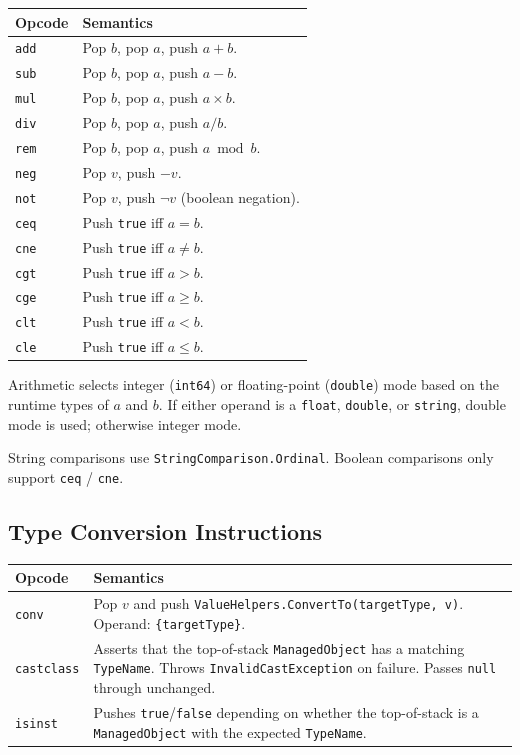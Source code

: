 \documentclass[11pt,a4paper]{article}
\newcommand{\code}[1]{\texttt{\small #1}}
\newcommand{\typename}[1]{\textcolor{typecolor}{\texttt{\small #1}}}
\begin{document}
\begin{longtable}{lp{10cm}}
  \toprule
  \textbf{Opcode} & \textbf{Semantics} \\
  \midrule
  \endhead
  \code{add}  & Pop \(b\), pop \(a\), push \(a + b\). \\
  \code{sub}  & Pop \(b\), pop \(a\), push \(a - b\). \\
  \code{mul}  & Pop \(b\), pop \(a\), push \(a \times b\). \\
  \code{div}  & Pop \(b\), pop \(a\), push \(a / b\). \\
  \code{rem}  & Pop \(b\), pop \(a\), push \(a \bmod b\). \\
  \code{neg}  & Pop \(v\), push \(-v\). \\
  \code{not}  & Pop \(v\), push \(\neg v\) (boolean negation). \\
  \code{ceq}  & Push \code{true} iff \(a = b\). \\
  \code{cne}  & Push \code{true} iff \(a \neq b\). \\
  \code{cgt}  & Push \code{true} iff \(a > b\). \\
  \code{cge}  & Push \code{true} iff \(a \geq b\). \\
  \code{clt}  & Push \code{true} iff \(a < b\). \\
  \code{cle}  & Push \code{true} iff \(a \leq b\). \\
  \bottomrule
\end{longtable}

Arithmetic selects integer (\code{int64}) or floating-point (\code{double}) mode
based on the runtime types of \(a\) and \(b\). If either operand is a \code{float},
\code{double}, or \code{string}, double mode is used; otherwise integer mode.

String comparisons use \code{StringComparison.Ordinal}. Boolean comparisons only
support \code{ceq} / \code{cne}.

\subsection{Type Conversion Instructions}

\begin{longtable}{lp{10cm}}
  \toprule
  \textbf{Opcode} & \textbf{Semantics} \\
  \midrule
  \endhead
  \code{conv}       & Pop \(v\) and push \code{ValueHelpers.ConvertTo(targetType, v)}.
                      Operand: \code{\{targetType\}}. \\
  \code{castclass}  & Asserts that the top-of-stack \typename{ManagedObject} has a
                      matching \code{TypeName}. Throws \typename{InvalidCastException}
                      on failure. Passes \code{null} through unchanged. \\
  \code{isinst}     & Pushes \code{true}/\code{false} depending on whether the
                      top-of-stack is a \typename{ManagedObject} with the expected
                      \code{TypeName}. \\
  \bottomrule
\end{longtable}
\end{document}
